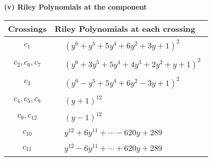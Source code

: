 \documentclass[1p]{elsarticle_modified}
\theoremstyle{definition}
\begin{document}
\newpage\renewcommand{\arraystretch}{1}
\flushleft \textbf{(v) Riley Polynomials at the component}\newline \\
\begin{tabular}{m{50pt}|m{274pt}}
Crossings & \hspace{64pt}Riley Polynomials at each crossing \\
\hline $$\begin{aligned}c_{1}\end{aligned}$$&$\begin{aligned}
&(y^6+y^5+5 y^4+6 y^2+3 y+1)^2
\end{aligned}$\\
\hline $$\begin{aligned}c_{2},c_{6},c_{7}\end{aligned}$$&$\begin{aligned}
&(y^6+3 y^5+5 y^4+4 y^3+2 y^2+y+1)^2
\end{aligned}$\\
\hline $$\begin{aligned}c_{3}\end{aligned}$$&$\begin{aligned}
&(y^6- y^5+5 y^4+6 y^2-3 y+1)^2
\end{aligned}$\\
\hline $$\begin{aligned}c_{4},c_{5},c_{8}\end{aligned}$$&$\begin{aligned}
&(y+1)^{12}
\end{aligned}$\\
\hline $$\begin{aligned}c_{9},c_{12}\end{aligned}$$&$\begin{aligned}
&(y-1)^{12}
\end{aligned}$\\
\hline $$\begin{aligned}c_{10}\end{aligned}$$&$\begin{aligned}
&y^{12}+6 y^{11}+\cdots-620 y+289
\end{aligned}$\\
\hline $$\begin{aligned}c_{11}\end{aligned}$$&$\begin{aligned}
&y^{12}-6 y^{11}+\cdots+620 y+289
\end{aligned}$\\
\hline
\end{tabular}\\~\\
\end{document}
